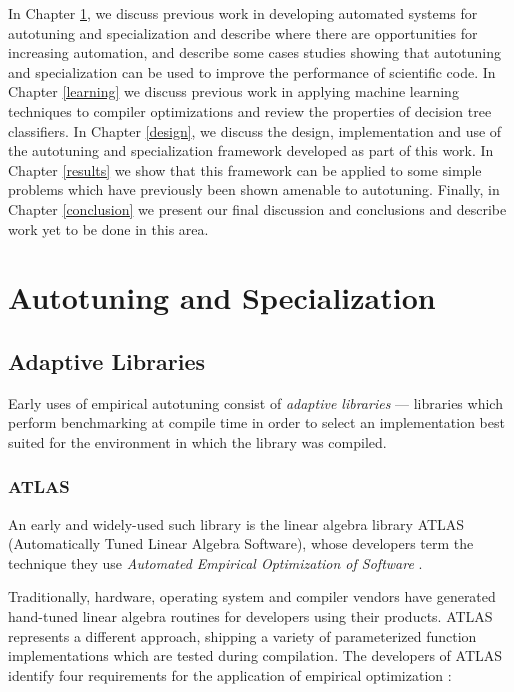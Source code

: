 \documentclass[msthesis,justified,copyright,final,numbers,sort&compress,
gsmodern,amstex,natbib]{uothesis}
\begin{document}
In Chapter \ref{autotuning}, we discuss previous work in developing automated systems for autotuning and specialization and describe where there are opportunities for increasing automation, and describe some cases studies showing that autotuning and specialization can be used to improve the performance of scientific code. In Chapter \ref{learning} we discuss previous work in applying machine learning techniques to compiler optimizations and review the properties of decision tree classifiers. In Chapter \ref{design}, we discuss the design, implementation and use of the autotuning and specialization framework developed as part of this work. In Chapter \ref{results} we show that this framework can be applied to some simple problems which have previously been shown amenable to autotuning. Finally, in Chapter \ref{conclusion} we present our final discussion and conclusions and describe work yet to be done in this area.


\chapter{Autotuning and Specialization}
\label{autotuning}

\section{Adaptive Libraries}
\label{adaptive}

Early uses of empirical autotuning consist of \emph{adaptive libraries} --- libraries which perform benchmarking at compile time in order to select an implementation best suited for the environment in which the library was compiled.

\subsection{ATLAS}

An early and widely-used such library is the linear algebra library ATLAS \cite{atlas} (Automatically Tuned Linear Algebra Software), whose developers term the technique they use \emph{Automated Empirical Optimization of Software} \cite{empatlas}. 

Traditionally, hardware, operating system and compiler vendors have generated hand-tuned linear algebra routines for developers using their products. ATLAS represents a different approach, shipping a variety of parameterized function implementations which are tested during compilation. The developers of ATLAS identify four requirements for the application of empirical optimization \cite{empatlas}:
\end{document}

